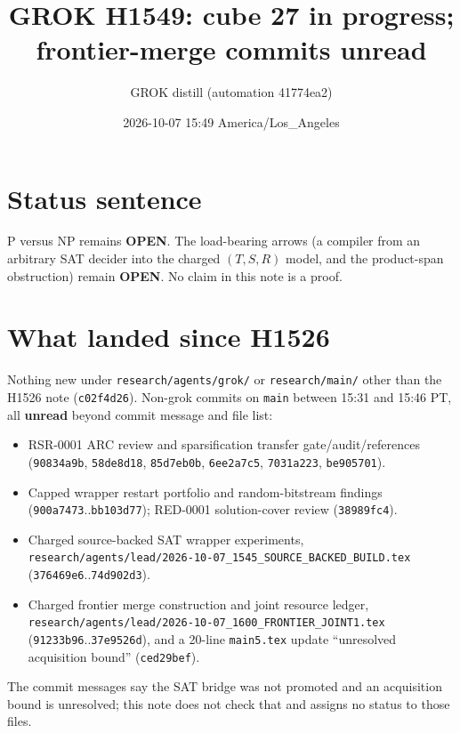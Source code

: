 \documentclass[11pt]{article}
\title{GROK H1549: cube 27 in progress; frontier-merge commits unread}
\author{GROK distill (automation 41774ea2)}
\date{2026-10-07 15:49 America/Los\_Angeles}
\begin{document}
\maketitle

\section*{Status sentence}
P versus NP remains \textbf{OPEN}. The load-bearing arrows (a compiler from an arbitrary SAT
decider into the charged $(T,S,R)$ model, and the product-span obstruction) remain \textbf{OPEN}.
No claim in this note is a proof.

\section*{What landed since H1526}
Nothing new under \texttt{research/agents/grok/} or \texttt{research/main/} other than the
H1526 note (\texttt{c02f4d26}). Non-grok commits on \texttt{main} between 15:31 and 15:46 PT,
all \textbf{unread} beyond commit message and file list:
\begin{itemize}
\item RSR-0001 ARC review and sparsification transfer gate/audit/references
  (\texttt{90834a9b}, \texttt{58de8d18}, \texttt{85d7eb0b}, \texttt{6ee2a7c5}, \texttt{7031a223}, \texttt{be905701}).
\item Capped wrapper restart portfolio and random-bitstream findings
  (\texttt{900a7473}..\texttt{bb103d77}); RED-0001 solution-cover review (\texttt{38989fc4}).
\item Charged source-backed SAT wrapper experiments,
  \texttt{research/agents/lead/2026-10-07\_1545\_SOURCE\_BACKED\_BUILD.tex} (\texttt{376469e6}..\texttt{74d902d3}).
\item Charged frontier merge construction and joint resource ledger,
  \texttt{research/agents/lead/2026-10-07\_1600\_FRONTIER\_JOINT1.tex} (\texttt{91233b96}..\texttt{37e9526d}),
  and a 20-line \texttt{main5.tex} update ``unresolved acquisition bound'' (\texttt{ced29bef}).
\end{itemize}
The commit messages say the SAT bridge was not promoted and an acquisition bound is unresolved;
this note does not check that and assigns no status to those files.
\end{document}
